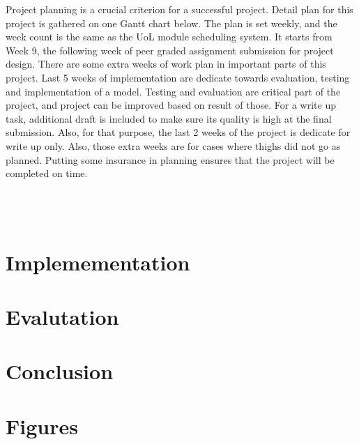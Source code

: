 \documentclass[11pt, natbib=false]{article}
\begin{document}
\begin{multicols}{2}
Project planning is a crucial criterion for a successful project. Detail plan for this project is gathered on one Gantt chart below.
The plan is set weekly, and the week count is the same as the UoL module scheduling system.
It starts from Week 9, the following week of peer graded assignment submission for project design.
There are some extra weeks of work plan in important parts of this project.
Last 5 weeks of implementation are dedicate towards evaluation, testing and implementation of a model.
Testing and evaluation are critical part of the project, and project can be improved based on result of those.
For a write up task, additional draft is included to make sure its quality is high at the final submission.
Also, for that purpose, the last 2 weeks of the project is dedicate for write up only.
Also, those extra weeks are for cases where thighs did not go as planned.
Putting some insurance in planning ensures that the project will be completed on time. \\
\\
\\
\\

\section{Implemementation}

\section{Evalutation}

\section{Conclusion}

\newpage
\printbibliography
\end{multicols}
\newpage
\section{Figures}
\end{document}
